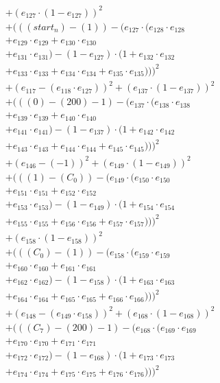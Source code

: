 \documentclass[10pt, a4paper]{article}
\begin{document}
\begin{small}
\begin{align*}
& + (e_{127} \cdot (1 - e_{127}))^{2} \\
& + (((start_n) - (1)) - (e_{127} \cdot (e_{128} \cdot e_{128} \\
& + e_{129} \cdot e_{129} + e_{130} \cdot e_{130} \\
& + e_{131} \cdot e_{131}) - (1 - e_{127}) \cdot (1 + e_{132} \cdot e_{132} \\
& + e_{133} \cdot e_{133} + e_{134} \cdot e_{134} + e_{135} \cdot e_{135})))^{2} \\
& + (e_{117} - (e_{118} \cdot e_{127}))^{2} + (e_{137} \cdot (1 - e_{137}))^{2} \\
& + (((0) - (200) - 1) - (e_{137} \cdot (e_{138} \cdot e_{138} \\
& + e_{139} \cdot e_{139} + e_{140} \cdot e_{140} \\
& + e_{141} \cdot e_{141}) - (1 - e_{137}) \cdot (1 + e_{142} \cdot e_{142} \\
& + e_{143} \cdot e_{143} + e_{144} \cdot e_{144} + e_{145} \cdot e_{145})))^{2} \\
& + (e_{146} - (-1))^{2} + (e_{149} \cdot (1 - e_{149}))^{2} \\
& + (((1) - (C_{0})) - (e_{149} \cdot (e_{150} \cdot e_{150} \\
& + e_{151} \cdot e_{151} + e_{152} \cdot e_{152} \\
& + e_{153} \cdot e_{153}) - (1 - e_{149}) \cdot (1 + e_{154} \cdot e_{154} \\
& + e_{155} \cdot e_{155} + e_{156} \cdot e_{156} + e_{157} \cdot e_{157})))^{2} \\
& + (e_{158} \cdot (1 - e_{158}))^{2} \\
& + (((C_{0}) - (1)) - (e_{158} \cdot (e_{159} \cdot e_{159} \\
& + e_{160} \cdot e_{160} + e_{161} \cdot e_{161} \\
& + e_{162} \cdot e_{162}) - (1 - e_{158}) \cdot (1 + e_{163} \cdot e_{163} \\
& + e_{164} \cdot e_{164} + e_{165} \cdot e_{165} + e_{166} \cdot e_{166})))^{2} \\
& + (e_{148} - (e_{149} \cdot e_{158}))^{2} + (e_{168} \cdot (1 - e_{168}))^{2} \\
& + (((C_{7}) - (200) - 1) - (e_{168} \cdot (e_{169} \cdot e_{169} \\
& + e_{170} \cdot e_{170} + e_{171} \cdot e_{171} \\
& + e_{172} \cdot e_{172}) - (1 - e_{168}) \cdot (1 + e_{173} \cdot e_{173} \\
& + e_{174} \cdot e_{174} + e_{175} \cdot e_{175} + e_{176} \cdot e_{176})))^{2} \\

\end{align*}
\end{small}
\end{document}
